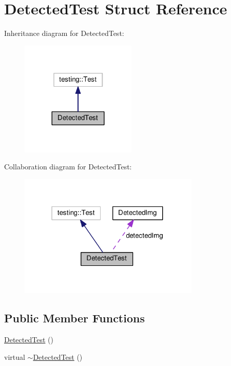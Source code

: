 \hypertarget{structDetectedTest}{}\section{Detected\+Test Struct Reference}
\label{structDetectedTest}


Inheritance diagram for Detected\+Test\+:
\nopagebreak
\begin{figure}[H]
\begin{center}
\leavevmode
\includegraphics[width=156pt]{structDetectedTest__inherit__graph}
\end{center}
\end{figure}


Collaboration diagram for Detected\+Test\+:
\nopagebreak
\begin{figure}[H]
\begin{center}
\leavevmode
\includegraphics[width=244pt]{structDetectedTest__coll__graph}
\end{center}
\end{figure}
\subsection*{Public Member Functions}
\begin{DoxyCompactItemize}
\item 
\hyperlink{structDetectedTest_a748e3dfbb0203c2f4e7b7970fbbcd39c}{Detected\+Test} ()
\item 
virtual \hyperlink{structDetectedTest_aae6a3bf0303439e9d4d7d390770a6fd1}{$\sim$\+Detected\+Test} ()
\end{DoxyCompactItemize}
